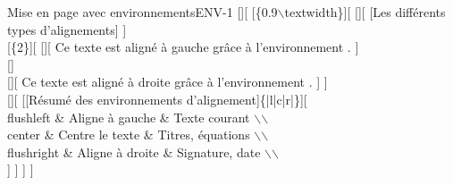 \begin{EXO}{Mise en page avec environnements}{ENV-1}
[][
	 [\{0.9$\backslash$textwidth\}][
		 [][
		 	[Les différents types d'alignements]
		]\\
		[\{2\}][
			[][
				Ce texte est aligné à gauche grâce à l'environnement .
			]\\
			[]\\
			[][
		 		Ce texte est aligné à droite grâce à l'environnement .
			]
		]\\
        [][
            [[Résumé des environnements d'alignement]\{|l|c|r|\}][
                \\
                flushleft \& Aligne à gauche \& Texte courant $\backslash$$\backslash$\\
                center \& Centre le texte \& Titres, équations $\backslash$$\backslash$\\
                flushright \& Aligne à droite \& Signature, date $\backslash$$\backslash$\\
            ]
        ]
	]
]
\end{EXO}
